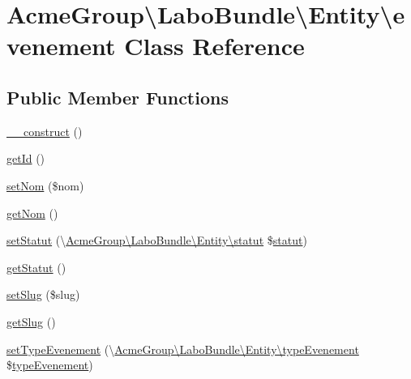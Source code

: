 \hypertarget{class_acme_group_1_1_labo_bundle_1_1_entity_1_1evenement}{\section{Acme\+Group\textbackslash{}Labo\+Bundle\textbackslash{}Entity\textbackslash{}evenement Class Reference}
\label{class_acme_group_1_1_labo_bundle_1_1_entity_1_1evenement}
}
\subsection*{Public Member Functions}
\begin{DoxyCompactItemize}
\item 
\hyperlink{class_acme_group_1_1_labo_bundle_1_1_entity_1_1evenement_a325bec80464d737570909bc39eb74567}{\+\_\+\+\_\+construct} ()
\item 
\hyperlink{class_acme_group_1_1_labo_bundle_1_1_entity_1_1evenement_ab5767233b5b424dc4b5ed7a7867821b9}{get\+Id} ()
\item 
\hyperlink{class_acme_group_1_1_labo_bundle_1_1_entity_1_1evenement_aaa727afc991dd74dc434566c1f38c390}{set\+Nom} (\$nom)
\item 
\hyperlink{class_acme_group_1_1_labo_bundle_1_1_entity_1_1evenement_abfef3904efd2cdaec115e443ddc07153}{get\+Nom} ()
\item 
\hyperlink{class_acme_group_1_1_labo_bundle_1_1_entity_1_1evenement_abb95678f595c97fe0e91448561fcc4ce}{set\+Statut} (\textbackslash{}\hyperlink{class_acme_group_1_1_labo_bundle_1_1_entity_1_1statut}{Acme\+Group\textbackslash{}\+Labo\+Bundle\textbackslash{}\+Entity\textbackslash{}statut} \$\hyperlink{class_acme_group_1_1_labo_bundle_1_1_entity_1_1statut}{statut})
\item 
\hyperlink{class_acme_group_1_1_labo_bundle_1_1_entity_1_1evenement_a28dba0f3efc66f65a7686e3e9d63c5b6}{get\+Statut} ()
\item 
\hyperlink{class_acme_group_1_1_labo_bundle_1_1_entity_1_1evenement_aebff6d0b0ebdf045f85961ebebf712c3}{set\+Slug} (\$slug)
\item 
\hyperlink{class_acme_group_1_1_labo_bundle_1_1_entity_1_1evenement_a52f461d19072891362c70228936f9189}{get\+Slug} ()
\item 
\hyperlink{class_acme_group_1_1_labo_bundle_1_1_entity_1_1evenement_a8d9553039fc6601cbbaf9002bd7a161c}{set\+Type\+Evenement} (\textbackslash{}\hyperlink{class_acme_group_1_1_labo_bundle_1_1_entity_1_1type_evenement}{Acme\+Group\textbackslash{}\+Labo\+Bundle\textbackslash{}\+Entity\textbackslash{}type\+Evenement} \$\hyperlink{class_acme_group_1_1_labo_bundle_1_1_entity_1_1type_evenement}{type\+Evenement})

\end{DoxyCompactItemize}
